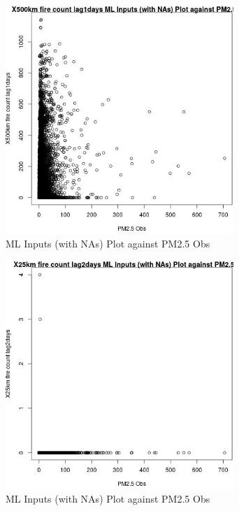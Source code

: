 \begin{figure} 
\centering  
\includegraphics[width=0.77\textwidth]{Code_Outputs/Report_ML_input_PM25_Step4_part_e_de_duplicated_aves_compiled_2019-05-14wNAs_X500km_fire_count_lag1daysvPM25_Obs.jpg} 
\caption{\label{fig:Report_ML_input_PM25_Step4_part_e_de_duplicated_aves_compiled_2019-05-14wNAsX500km_fire_count_lag1daysvPM25_Obs}ML Inputs (with NAs) Plot against PM2.5 Obs} 
\end{figure} 
 

\clearpage 

\begin{figure} 
\centering  
\includegraphics[width=0.77\textwidth]{Code_Outputs/Report_ML_input_PM25_Step4_part_e_de_duplicated_aves_compiled_2019-05-14wNAs_X25km_fire_count_lag2daysvPM25_Obs.jpg} 
\caption{\label{fig:Report_ML_input_PM25_Step4_part_e_de_duplicated_aves_compiled_2019-05-14wNAsX25km_fire_count_lag2daysvPM25_Obs}ML Inputs (with NAs) Plot against PM2.5 Obs} 
\end{figure} 
 

